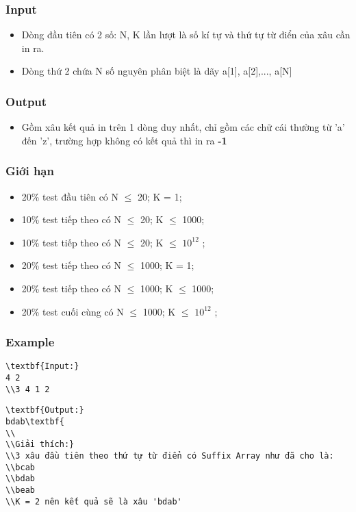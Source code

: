 \subsubsection{   Input  }
\begin{itemize}
	\item     Dòng đầu tiên có 2 số: N, K lần lượt là số kí tự và thứ tự từ điển của xâu cần in ra.   
	\item     Dòng thứ 2 chứa N số nguyên phân biệt là dãy a[1], a[2],..., a[N]   
\end{itemize}

\subsubsection{   Output  }
\begin{itemize}
	\item     Gồm xâu kết quả in trên 1 dòng duy nhất, chỉ gồm các chữ cái thường từ 'a' đến 'z', trường hợp không có kết quả thì in ra    \textbf{     -1    }
\end{itemize}

\subsubsection{   Giới hạn  }
\begin{itemize}
	\item     20\% test đầu tiên có N  $\le$  20; K = 1;   
	\item     10\% test tiếp theo có N  $\le$  20; K  $\le$  1000;   
	\item     10\% test tiếp theo có N  $\le$  20; K  $\le$  $10^{12}$    ;   
	\item     20\% test tiếp theo có N  $\le$  1000; K = 1;   
	\item     20\% test tiếp theo có N  $\le$  1000; K  $\le$ 1000;   
	\item     20\% test cuối cùng có N  $\le$  1000; K  $\le$  $10^{12}$    ;   
\end{itemize}

\subsubsection{   Example  }
\begin{verbatim}
\textbf{Input:}
4 2
\\3 4 1 2\end{verbatim}
\begin{verbatim}
\textbf{Output:}
bdab\textbf{
\\
\\Giải thích:}
\\3 xâu đầu tiên theo thứ tự từ điển có Suffix Array như đã cho là:
\\bcab
\\bdab
\\beab
\\K = 2 nên kết quả sẽ là xâu 'bdab' \end{verbatim}
